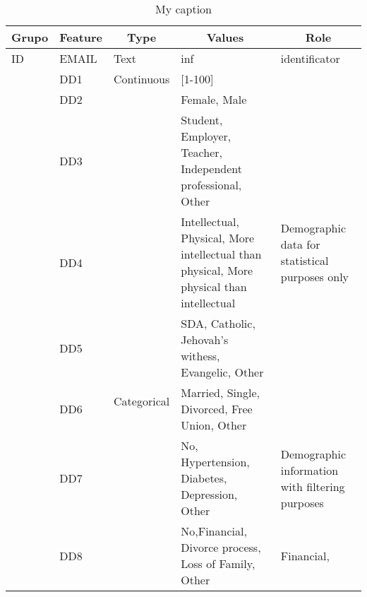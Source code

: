 \documentclass[10pt,letterpaper]{article}
\begin{document}
\begin{table}[]
	\centering
	\caption{My caption}
	\label{my-label}
	\begin{tabular}{|l|l|l|p{5cm}|p{4cm}|}
		\hline
		\multicolumn{1}{|c|}{\textbf{Grupo}} & \multicolumn{1}{c|}{\textbf{Feature}} & \multicolumn{1}{c|}{\textbf{Type}} & \multicolumn{1}{c|}{\textbf{Values}}                                                     & \multicolumn{1}{c|}{\textbf{Role}}                              \\ \hline
		ID                                   & EMAIL                                 & Text                               & inf                                                                                      & identificator                                                   \\ \hline
		\multirow{8}{*}{}         & DD1                                   & Continuous                         & {[}1-100{]}                                                                              & \multirow{6}{4cm}{Demographic data for statistical purposes only} \\ \cline{2-4}
		& DD2                                   &        & Female, Male                                                                             &                                                                 \\ \cline{2-2} \cline{4-4} 
		& DD3                                   &                                    & Student, Employer, Teacher, Independent professional, Other                              &                                                                 \\ \cline{2-2} \cline{4-4}
		& DD4                                   & \multirow{6}{*}{Categorical}                                  & Intellectual, Physical, More intellectual than physical, More physical than intellectual &                                                                 \\ \cline{2-2} \cline{4-4} {Demographic}
		& DD5                                   &                                    & SDA, Catholic, Jehovah's withess, Evangelic, Other                                       &                                       \\ \cline{2-2} \cline{4-4} 
		& DD6                                   &                                    & Married, Single, Divorced, Free Union, Other                                             &                                                                 \\ \cline{2-2} \cline{4-5} 
		& DD7                                   &                                    & No, Hypertension, Diabetes, Depression, Other                                            & Demographic information with filtering purposes                 \\ \cline{2-5} 
		& DD8                                   &                                    & No,Financial, Divorce process, Loss of Family, Other                                     & Financial,                                                      \\ \hline
	\end{tabular}
\end{table}
\end{document}
